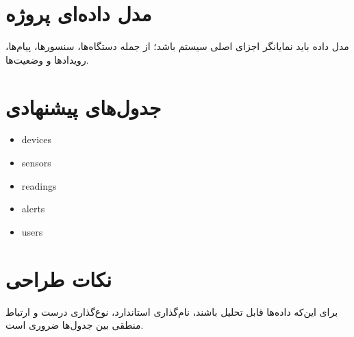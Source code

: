 \section{مدل داده‌ای پروژه}

مدل داده باید نمایانگر اجزای اصلی سیستم باشد؛ از جمله دستگاه‌ها، سنسورها، پیام‌ها، رویدادها و وضعیت‌ها.

\section{جدول‌های پیشنهادی}

\begin{itemize}
    \item devices
    \item sensors
    \item readings
    \item alerts
    \item users
\end{itemize}

\section{نکات طراحی}

برای این‌که داده‌ها قابل تحلیل باشند، نام‌گذاری استاندارد، نوع‌گذاری درست و ارتباط منطقی بین جدول‌ها ضروری است.
